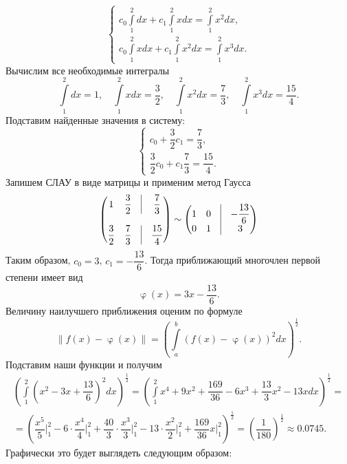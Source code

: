 \documentclass[a4paper, 12pt]{article}
\renewcommand{\varphi}{\upvarphi}
\newcommand\Norm[1]{\left\| #1 \right\|}
\begin{document}
	$$\begin{cases}
		c_0\int\limits_1^2  dx+ c_1\int\limits_1^2 x dx= \int\limits_1^2 x^2dx,\\
		c_0\int\limits_1^2 x dx+ c_1\int\limits_1^2 x^2 dx= \int\limits_1^2 x^3dx.
	\end{cases}$$
	Вычислим все необходимые интегралы $$\int\limits_1^2  dx = 1,\quad \int\limits_1^2 xdx = \dfrac32,\quad \int\limits_1^2 x^2 dx = \dfrac73,\quad \int\limits_1^2 x^3 dx = \dfrac{15}{4}.$$
	Подставим найденные значения в систему:
	$$\begin{cases}
		c_0+ \dfrac32c_1= \dfrac73,\\
		\dfrac32c_0+ c_1\dfrac73= \dfrac{15}{4}.
	\end{cases}$$
	Запишем СЛАУ в виде матрицы и применим метод Гаусса $$\begin{pmatrix}
	1 & \dfrac32 & \vline & \dfrac73\\\\
	\dfrac32 & \dfrac73 & \vline & \dfrac{15}{4}
	\end{pmatrix}
	\sim
	\begin{pmatrix}
		1 & 0 & \vline & -\dfrac{13}{6}\\
		0 & 1 & \vline & 3
	\end{pmatrix}
	$$
	Таким образом, $c_0 = 3$, $c_1 = -\dfrac{13}{6}$. Тогда приближающий многочлен первой степени имеет вид $$\varphi(x) = 3x - \dfrac{13}{6}.$$
	Величину наилучшего приближения оценим по формуле $$\Norm{f(x) - \varphi(x)} = \left(\int\limits_a^b(f(x) - \varphi(x))^2dx\right)^{\frac12}.$$
	Подставим наши функции и получим \begin{multline*}
		\left(\int\limits_1^2\left(x^2 - 3x + \dfrac{13}{6}\right)^2dx\right)^{\frac12} = \left(\int\limits_1^2x^4 + 9x^2+\dfrac{169}{36} - 6x^3 + \dfrac{13}{3}x^2 - 13xdx\right)^{\frac12} =\\= \left(\dfrac{x^5}{5}\Big|_1^2 -6\cdot \dfrac{x^4}{4}\Big|_1^2+ \dfrac{40}{3}\cdot\dfrac{x^3}{3}\Big|_1^2 - 13\cdot \dfrac{x^2}{2}\Big|_1^2 + \dfrac{169}{36}x\Big|_1^2\right)^{\frac12} = \left(\dfrac{1}{180}\right)^{\frac12} \approx 0.0745.
	\end{multline*}
	Графически это будет выглядеть следующим образом:
	\begin{center}\end{center}
\end{document}
